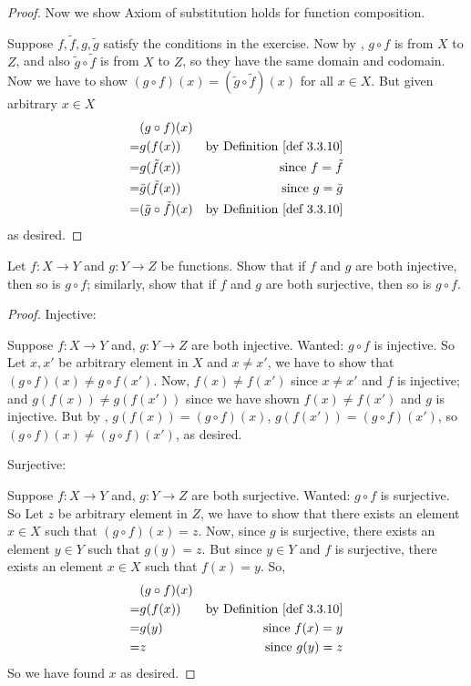\begin{proof}
Now we show Axiom of substitution  holds for function composition.

Suppose \(f, \tilde{f}, g, \tilde{g}\) satisfy the conditions in the exercise. Now by , \(g \circ f\) is from \(X\) to \(Z\), and also \(\tilde{g} \circ \tilde{f}\) is from \(X\) to \(Z\), so they have the same domain and codomain. Now we have to show \((g \circ f)(x) = (\tilde{g} \circ \tilde{f})(x)\) for all \(x \in X\). But given arbitrary \(x \in X\)
\begin{align*}
      & (g \circ f)(x) \\
    = & g(f(x)) & \text{by \DEF{3.3.10}} \\
    = & g(\tilde{f}(x)) & \text{since \(f = \tilde{f}\)} \\
    = & \tilde{g}(\tilde{f}(x)) & \text{since \(g = \tilde{g}\)} \\
    = & (\tilde{g} \circ \tilde{f})(x) & \text{by \DEF{3.3.10}}
\end{align*}
as desired.
\end{proof}

\begin{exercise} \label{exercise 3.3.2}
Let \(f : X \rightarrow Y\) and \(g : Y \rightarrow Z\) be functions. Show that if \(f\) and \(g\) are both injective, then so is \(g \circ f\); similarly, show that if \(f\) and \(g\) are both surjective, then so is \(g \circ f\).
\end{exercise}

\begin{proof}
Injective:

Suppose \(f : X \rightarrow Y\) and, \(g : Y \rightarrow Z\) are both injective. Wanted: \(g \circ f\) is injective. So Let \(x, x'\) be arbitrary element in \(X\) and \(x \neq x'\), we have to show that \((g \circ f)(x) \neq g \circ f(x')\). Now, \(f(x) \neq f(x')\) since \(x \neq x'\) and \(f\) is injective; and \(g(f(x)) \neq g(f(x'))\) since we have shown \(f(x) \neq f(x')\) and \(g\) is injective. But by , \(g(f(x)) = (g \circ f)(x)\), \(g(f(x')) = (g \circ f)(x')\), so \((g \circ f)(x) \neq (g \circ f)(x')\), as desired.


Surjective:

Suppose \(f : X \rightarrow Y\) and, \(g : Y \rightarrow Z\) are both surjective. Wanted: \(g \circ f\) is surjective. So Let \(z\) be arbitrary element in \(Z\), we have to show that there exists an element \(x \in X\) such that \((g \circ f)(x) = z\). Now, since \(g\) is surjective, there exists an element \(y \in Y\) such that \(g(y) = z\). But since \(y \in Y\) and \(f\) is surjective, there exists an element \(x \in X\) such that \(f(x) = y\). So,
\begin{align*}
      & (g \circ f)(x) \\
    = & g(f(x)) & \text{by \DEF{3.3.10}} \\
    = & g(y)    &\text{since \(f(x) = y\)} \\
    = & z       & \text{since \(g(y) = z\)}
\end{align*}
So we have found \(x\) as desired.
\end{proof}

